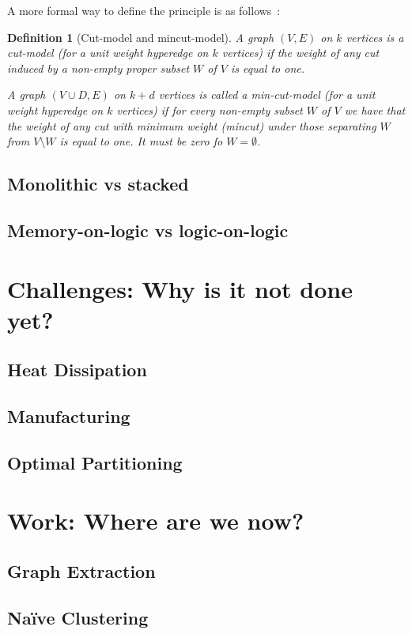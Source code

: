 \documentclass[12pt,a4paper]{article}
\theoremstyle{customdef}
\newtheorem{definition}{Definition}
\begin{document}
A more formal way to define the principle is as follows~:
\begin{definition}[Cut-model and mincut-model]\label{def:cut-model-formal}
A graph $(V, E)$ on $k$ vertices is a cut-model (for a unit weight hyperedge on $k$ vertices) if the weight of any cut induced by a non-empty proper subset $W$ of $V$ is equal to one.

A graph $(V \cup D,E)$ on $k+d$ vertices is called a min-cut-model (for a unit weight hyperedge on $k$ vertices) if for every non-empty subset $W$ of $V$ we have that the weight of any cut with minimum weight (mincut) under those separating $W$ from $V \setminus W$ is equal to one.
It must be zero fo $W=\emptyset$.%
\end{definition}

\subsection{Monolithic vs stacked}
\subsection{Memory-on-logic vs logic-on-logic}


\section{Challenges: Why is it not done yet?}
\subsection{Heat Dissipation}
\subsection{Manufacturing}
\subsection{Optimal Partitioning}


\section{Work: Where are we now?}
\subsection{Graph Extraction}
\subsection{Naïve Clustering}
\end{document}
